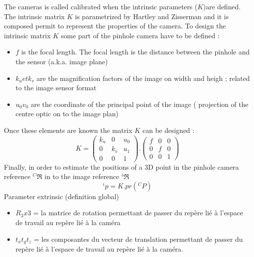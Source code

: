 The cameras is called calibrated when the intrinsic parameters ($K$)are defined.  
 The intrinsic matrix $K$ is parametrized by Hartley and Zisserman and it is composed permit to represent the properties of the camera. To design the intrinsic matrix $K$ some part of the pinhole camera have to be defined :\\
  \begin{itemize}
  
 	\item $f$ is  the focal length. The focal length is the distance between the pinhole and the sensor (a.k.a. image plane)
  	\item $k_u et k_v$ are the magnification factors of the image on width and heigh ; related to the image sensor format%
  	\item $u_0 v_0$  are the coordinate  of  the principal point of the image ( projection of the centre optic on to the image plan)  %
  	  \end{itemize}
		Once these elements are known the matrix $K$ can be designed :
	\begin{equation}
		K=
		\begin{pmatrix}
			k_u 	& 0 	& u_0 \\
			0 		& k_v	& u_1\\
			0 		&	0	& 1
		\end{pmatrix} .
		\begin{pmatrix}
			f 		& 0 	& 0  \\
			0 		& f		& 0  \\
			0 		&	0	& 1  
		\end{pmatrix} 
	\label{eq:K}
	\end{equation}
Finally, in order to estimate the positions of a 3D point in the pinhole camera reference $^C\Re$ in to the image reference $^i\Re$ 
$$
^ip=K.pr(^CP)
$$ 	  
 Parameter extrinsic (definition global) \\
  \begin{itemize}
 	\item$R_3x3$ = la matrice de rotation permettant de passer du repère lié à l'espace de travail au repère lié à la caméra\\
 	\item$t_x t_y t_z$ = les composantes du vecteur de translation permettant de passer du repère lié à l'espace de travail au repère lié à la caméra.\\
  \end{itemize}
 
